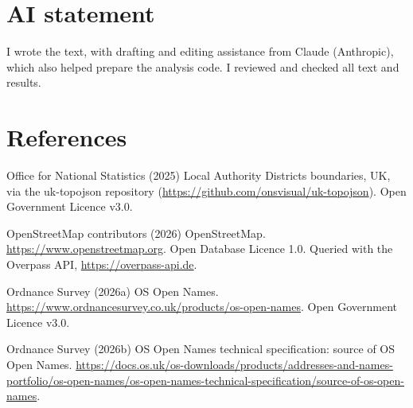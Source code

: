 \documentclass[11pt,a4paper]{article}
\begin{document}
\section*{AI statement}

I wrote the text, with drafting and editing assistance from Claude (Anthropic), which also helped prepare the analysis code. I reviewed and checked all text and results.

\section*{References}

\small
Office for National Statistics (2025) Local Authority Districts boundaries, UK, via the uk-topojson repository (\url{https://github.com/onsvisual/uk-topojson}). Open Government Licence v3.0.

OpenStreetMap contributors (2026) OpenStreetMap. \url{https://www.openstreetmap.org}. Open Database Licence 1.0. Queried with the Overpass API, \url{https://overpass-api.de}.

Ordnance Survey (2026a) OS Open Names. \url{https://www.ordnancesurvey.co.uk/products/os-open-names}. Open Government Licence v3.0.

Ordnance Survey (2026b) OS Open Names technical specification: source of OS Open Names. \url{https://docs.os.uk/os-downloads/products/addresses-and-names-portfolio/os-open-names/os-open-names-technical-specification/source-of-os-open-names}.
\end{document}
